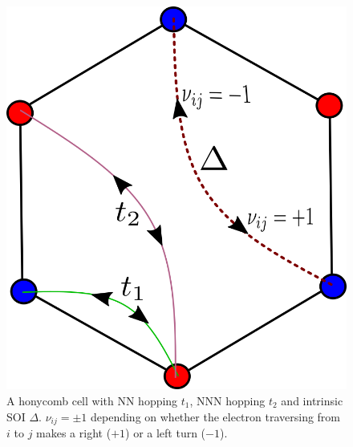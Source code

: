 \documentclass[aps,prl,twocolumn,amsmath,amssymb,nobibnotes]{revtex4-1}%
\begin{document}
\begin{figure}[t]
\centering
\includegraphics[width=0.6\columnwidth]{../Figures/kmh.png}
\caption{A honycomb cell with NN hopping $t_1$, NNN hopping $t_2$ and intrinsic SOI $\Delta$. $\nu_{ij} = \pm 1$ depending on whether the electron traversing from $i$ to $j$ makes a right ($+1$) or a left turn ($-1$).}
\label{fig1}
\vspace*{-6pt}
\end{figure}
\end{document}
